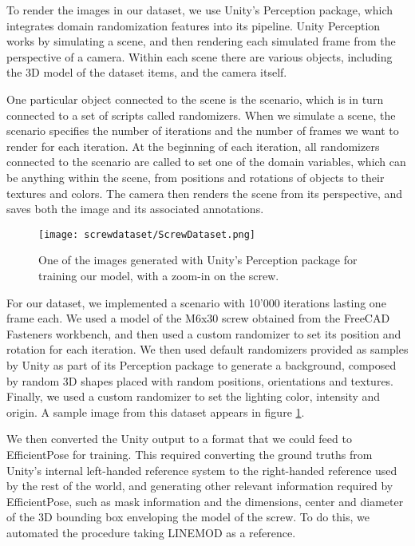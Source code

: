 To render the images in our dataset, we use Unity's Perception package\cite{unityPerception}, which integrates domain randomization features into its pipeline. Unity Perception works by simulating a scene, and then rendering each simulated frame from the perspective of a camera. Within each scene there are various objects, including the 3D model of the dataset items, and the camera itself. 

One particular object connected to the scene is the scenario, which is in turn connected to a set of scripts called randomizers. When we simulate a scene, the scenario specifies the number of iterations and the number of frames we want to render for each iteration. At the beginning of each iteration, all randomizers connected to the scenario are called to set one of the domain variables, which can be anything within the scene, from positions and rotations of objects to their textures and colors. The camera then renders the scene from its perspective, and saves both the image and its associated annotations.

\begin{figure}
    \centering
    \texttt{[image: screwdataset/ScrewDataset.png]}
    \caption{One of the images generated with Unity's Perception package for training our model, with a zoom-in on the screw.}
    \label{fig:screwdataset}
\end{figure}

For our dataset, we implemented a scenario with 10'000 iterations lasting one frame each. We used a model of the M6x30 screw obtained from the FreeCAD Fasteners workbench\cite{Fasteners}, and then used a custom randomizer to set its position and rotation for each iteration. We then used default randomizers provided as samples by Unity as part of its Perception package to generate a background, composed by random 3D shapes placed with random positions, orientations and textures. Finally, we used a custom randomizer to set the lighting color, intensity and origin. A sample image from this dataset appears in figure \ref{fig:screwdataset}.

We then converted the Unity output to a format that we could feed to EfficientPose for training. This required converting the ground truths from Unity's internal left-handed reference system to the right-handed reference used by the rest of the world, and generating other relevant information required by EfficientPose, such as mask information and the dimensions, center and diameter of the 3D bounding box enveloping the model of the screw. To do this, we automated the procedure taking LINEMOD as a reference.

